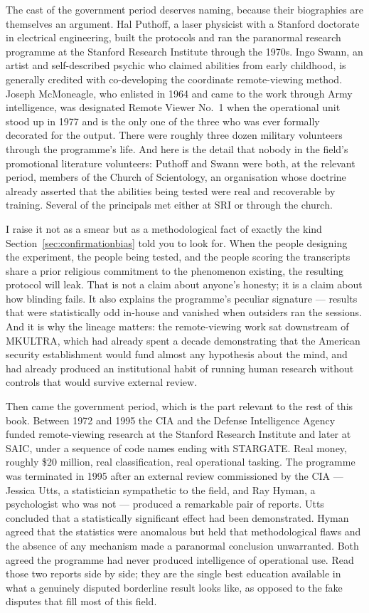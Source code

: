 The cast of the government period deserves naming, because their biographies are themselves an
argument. Hal Puthoff, a laser physicist with a Stanford doctorate in electrical engineering,
built the protocols and ran the paranormal research programme at the Stanford Research Institute
through the 1970s. Ingo Swann, an artist and self-described psychic who claimed abilities from
early childhood, is generally credited with co-developing the coordinate remote-viewing method.
Joseph McMoneagle, who enlisted in 1964 and came to the work through Army intelligence, was
designated Remote Viewer No.~1 when the operational unit stood up in 1977 and is the only one of
the three who was ever formally decorated for the output. There were roughly three dozen
military volunteers through the programme's life. And here is the detail that nobody in the
field's promotional literature volunteers: Puthoff and Swann were both, at the relevant period,
members of the Church of Scientology, an organisation whose doctrine already asserted that the
abilities being tested were real and recoverable by training. Several of the principals met
either at SRI or through the church.

I raise it not as a smear but as a methodological fact of exactly the kind Section~\ref{sec:confirmationbias} told you
to look for. When the people designing the experiment, the people being tested, and the people
scoring the transcripts share a prior religious commitment to the phenomenon existing, the
resulting protocol will leak. That is not a claim about anyone's honesty; it is a claim about how
blinding fails. It also explains the programme's peculiar signature --- results that were
statistically odd in-house and vanished when outsiders ran the sessions. And it is why the
lineage matters: the remote-viewing work sat downstream of MKULTRA, which had already spent a
decade demonstrating that the American security establishment would fund almost any hypothesis
about the mind, and had already produced an institutional habit of running human research
without controls that would survive external review.

Then came the government period, which is the part relevant to the rest of this book. Between 1972
and 1995 the CIA and the Defense Intelligence Agency funded remote-viewing research at the Stanford
Research Institute and later at SAIC, under a sequence of code names ending with STARGATE. Real
money, roughly \$20 million, real classification, real operational tasking. The programme was
terminated in 1995 after an external review commissioned by the CIA --- Jessica Utts, a
statistician sympathetic to the field, and Ray Hyman, a psychologist who was not --- produced a
remarkable pair of reports. Utts concluded that a statistically significant effect had been
demonstrated. Hyman agreed that the statistics were anomalous but held that methodological
flaws and the absence of any mechanism made a paranormal conclusion unwarranted. Both agreed the
programme had never produced intelligence of operational use. Read those two reports side by side;
they are the single best education available in what a genuinely disputed borderline result looks
like, as opposed to the fake disputes that fill most of this field.

